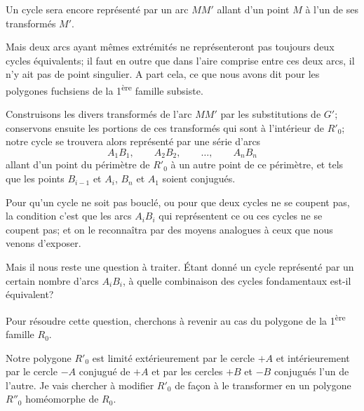 \documentclass{article}
\begin{document}
Un cycle sera encore représenté par un arc $MM'$ allant d'un point $M$ à l'un de ses transformés $M'$.

Mais deux arcs ayant mêmes extrémités ne représenteront pas toujours deux cycles équivalents; il faut en outre que dans l'aire comprise entre ces deux arcs, il n'y ait pas de point singulier. A part cela, ce que nous avons dit pour les polygones fuchsiens de la 1\textsuperscript{ère} famille subsiste.

Construisons les divers transformés de l'arc $MM'$ par les substitutions de $G'$; conservons ensuite les portions de ces transformés qui sont à l'intérieur de $R'_{0}$; notre cycle se trouvera alors représenté par une série d'arcs
\[ A_{1}B_{1}, \qquad A_{2}B_{2}, \qquad \ldots, \qquad A_{n}B_{n} \]
allant d'un point du périmètre de $R'_{0}$ à un autre point de ce périmètre, et tels que les points $B_{i-1}$ et $A_{i}$, $B_{n}$ et $A_{1}$ soient conjugués.

Pour qu'un cycle ne soit pas bouclé, ou pour que deux cycles ne se coupent pas, la condition c'est que les arcs $A_{i}B_{i}$ qui représentent ce ou ces cycles ne se coupent pas; et on le reconnaîtra par des moyens analogues à ceux que nous venons d'exposer.

Mais il nous reste une question à traiter. Étant donné un cycle représenté par un certain nombre d'arcs $A_{i}B_{i}$, à quelle combinaison des cycles fondamentaux est-il équivalent?


Pour résoudre cette question, cherchons à revenir au cas du polygone de la 1\textsuperscript{ère} famille $R_{0}$.


Notre polygone $R'_{0}$ est limité extérieurement par le cercle $+A$ et intérieurement par le cercle $-A$ conjugué de $+A$ et par les cercles $+B$ et $-B$ conjugués l'un de l'autre. Je vais chercher à modifier $R'_{0}$ de façon à le transformer en un polygone $R''_{0}$ homéomorphe de $R_{0}$.
\end{document}

